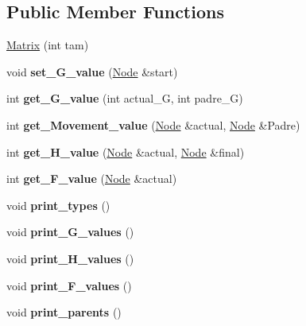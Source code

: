 \subsection*{Public Member Functions}
\begin{DoxyCompactItemize}
\item 
\hyperlink{class_matrix_ae763d5a5d65e3c0f185bebd7766124ba}{Matrix} (int tam)
\item 
\hypertarget{class_matrix_a9e800d91cc87f1787b59e44d2629a47a}{void {\bfseries set\+\_\+\+G\+\_\+value} (\hyperlink{class_node}{Node} \&start)}\label{class_matrix_a9e800d91cc87f1787b59e44d2629a47a}

\item 
\hypertarget{class_matrix_aab920af4cdc993e76d835a94fee167e5}{int {\bfseries get\+\_\+\+G\+\_\+value} (int actual\+\_\+\+G, int padre\+\_\+\+G)}\label{class_matrix_aab920af4cdc993e76d835a94fee167e5}

\item 
\hypertarget{class_matrix_a39a439d7ac7708e227454d11024f5149}{int {\bfseries get\+\_\+\+Movement\+\_\+value} (\hyperlink{class_node}{Node} \&actual, \hyperlink{class_node}{Node} \&Padre)}\label{class_matrix_a39a439d7ac7708e227454d11024f5149}

\item 
\hypertarget{class_matrix_a932b79cff699bcf30f93ce400f671c88}{int {\bfseries get\+\_\+\+H\+\_\+value} (\hyperlink{class_node}{Node} \&actual, \hyperlink{class_node}{Node} \&final)}\label{class_matrix_a932b79cff699bcf30f93ce400f671c88}

\item 
\hypertarget{class_matrix_a3bb5682f90b4ab6355c4c2d23b82dcd6}{int {\bfseries get\+\_\+\+F\+\_\+value} (\hyperlink{class_node}{Node} \&actual)}\label{class_matrix_a3bb5682f90b4ab6355c4c2d23b82dcd6}

\item 
\hypertarget{class_matrix_aaccd89e0e4c579772efd5321acaa60ad}{void {\bfseries print\+\_\+types} ()}\label{class_matrix_aaccd89e0e4c579772efd5321acaa60ad}

\item 
\hypertarget{class_matrix_ae7608f3bd82b1eb5b60749ff9d8cd297}{void {\bfseries print\+\_\+\+G\+\_\+values} ()}\label{class_matrix_ae7608f3bd82b1eb5b60749ff9d8cd297}

\item 
\hypertarget{class_matrix_ab0aeafedca8fe4d517562cdc4c17d54c}{void {\bfseries print\+\_\+\+H\+\_\+values} ()}\label{class_matrix_ab0aeafedca8fe4d517562cdc4c17d54c}

\item 
\hypertarget{class_matrix_ac356ebe8648bcba0b84e1d0b7bb491a0}{void {\bfseries print\+\_\+\+F\+\_\+values} ()}\label{class_matrix_ac356ebe8648bcba0b84e1d0b7bb491a0}

\item 
\hypertarget{class_matrix_a88feb88b79777e871a8a95d70894f1a5}{void {\bfseries print\+\_\+parents} ()}\label{class_matrix_a88feb88b79777e871a8a95d70894f1a5}

\end{DoxyCompactItemize}
